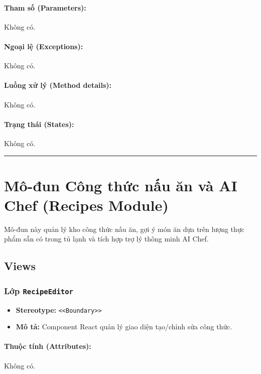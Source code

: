 \documentclass[12pt,a4paper]{article}
\begin{document}
\paragraph{Tham số (Parameters):}
Không có.

\paragraph{Ngoại lệ (Exceptions):}
Không có.

\paragraph{Luồng xử lý (Method details):}
Không có.

\paragraph{Trạng thái (States):}
Không có.

\vskip 0.5cm
\noindent\rule{\textwidth}{0.5pt}
\vskip 0.5cm

\section{Mô-đun Công thức nấu ăn và AI Chef (Recipes Module)}

Mô-đun này quản lý kho công thức nấu ăn, gợi ý món ăn dựa trên lượng thực phẩm sẵn có trong tủ lạnh và tích hợp trợ lý thông minh AI Chef.

\subsection{Views}

\subsubsection{Lớp \texttt{RecipeEditor}}
\begin{itemize}[leftmargin=*]
    \item \textbf{Stereotype:} \texttt{\textless{}\textless{}Boundary\textgreater{}\textgreater{}}
    \item \textbf{Mô tả:} Component React quản lý giao diện tạo/chỉnh sửa công thức.
\end{itemize}

\paragraph{Thuộc tính (Attributes):}
Không có.
\end{document}
